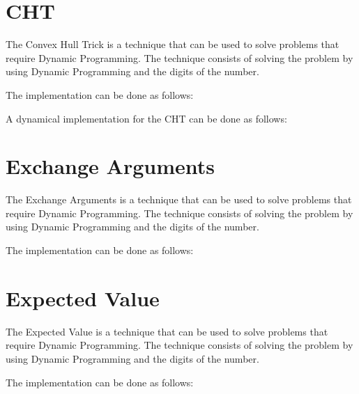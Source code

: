 

\section{CHT}

The Convex Hull Trick is a technique that can be used to solve problems that require Dynamic Programming. The technique consists of solving the problem by using Dynamic Programming and the digits of the number.

The implementation can be done as follows:



A dynamical implementation for the CHT can be done as follows:




\section{Exchange Arguments}

The Exchange Arguments is a technique that can be used to solve problems that require Dynamic Programming. The technique consists of solving the problem by using Dynamic Programming and the digits of the number.

The implementation can be done as follows:




\section{Expected Value}

The Expected Value is a technique that can be used to solve problems that require Dynamic Programming. The technique consists of solving the problem by using Dynamic Programming and the digits of the number.

The implementation can be done as follows:



